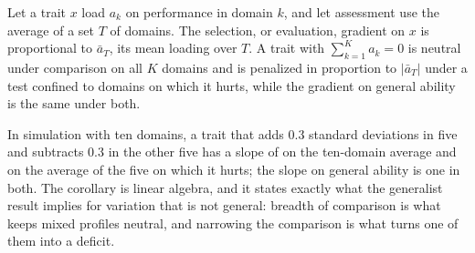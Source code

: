 \begin{corollary}\label{cor:narrow}
Let a trait $x$ load $a_k$ on performance in domain $k$, and let assessment use the average of a set $T$ of domains. The
selection, or evaluation, gradient on $x$ is proportional to $\bar a_T$, its mean loading over $T$. A trait with
$\sum_{k=1}^{K}a_k=0$ is neutral under comparison on all $K$ domains and is penalized in proportion to $|\bar a_T|$ under a
test confined to domains on which it hurts, while the gradient on general ability is the same under both.
\end{corollary}

In simulation with ten domains, a trait that adds 0.3 standard deviations in five and subtracts 0.3 in the other five has
a slope of \NtNarBroad{} on the ten-domain average and \NtNarHurt{} on the average of the five on which it hurts; the slope
on general ability is one in both. The corollary is linear algebra, and it states exactly what the generalist result
implies for variation that is not general: breadth of comparison is what keeps mixed profiles neutral, and narrowing the
comparison is what turns one of them into a deficit.
